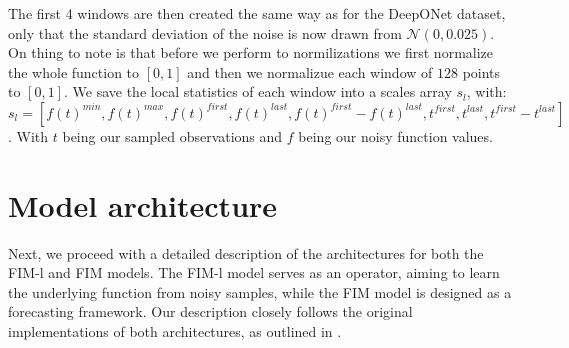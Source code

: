 \documentclass{article}
\theoremstyle{plain}
\theoremstyle{definition}
\theoremstyle{remark}
\begin{document}
The first $4$ windows are then created the same way as for the DeepONet dataset, only that the standard deviation of the noise is now drawn from $\mathcal{N}(0, 0.025)$.
On thing to note is that before we perform to normilizations we first normalize the whole function to $[0,1]$ and then we normalizue each window of $128$ points to $[0,1]$. We save the local statistics of each window into a scales array $s_l$, with:
$s_l = [f(t)^{min}, f(t)^{max}, f(t)^{first}, f(t)^{last}, f(t)^{first} - f(t)^{last}, t^{first}, t^{last}, t^{first} - t^{last}]$. With $t$ being our sampled observations and $f$ being our noisy function values.


\section{Model architecture}
Next, we proceed with a detailed description of the architectures for both the FIM-l and FIM models. The FIM-l model serves as an operator, aiming to learn the underlying function from noisy samples, while the FIM model is designed as a forecasting framework. Our description closely follows the original implementations of both architectures, as outlined in \cite{fim-l}.
\end{document}

